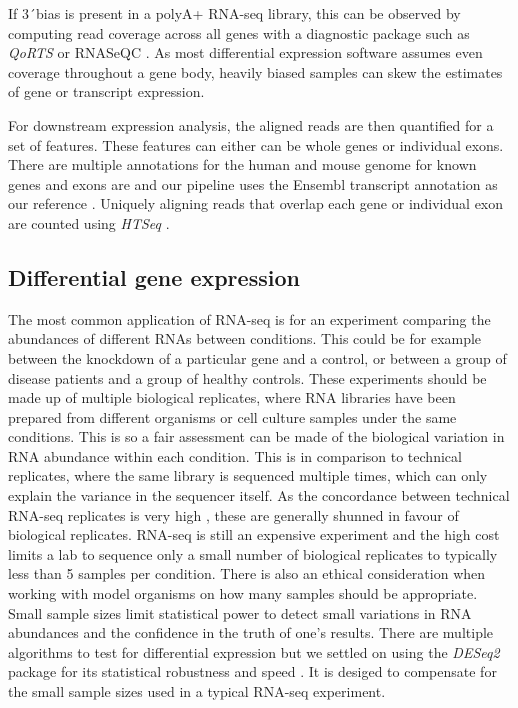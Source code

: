 If 3\'\ bias is present in a polyA+ RNA-seq library, this can be observed by computing read coverage across all genes with a diagnostic package such as \textit{QoRTS} or RNASeQC \citep{Hartley2015a, Deluca2012}. 
As most differential expression software assumes even coverage throughout a gene body, heavily biased samples can skew the estimates of gene or transcript expression.

For downstream expression analysis, the aligned reads are then quantified for a set of features. These features can either can be whole genes or individual exons. 
There are multiple annotations for the human and mouse genome for known genes and exons are and our pipeline uses the Ensembl transcript annotation as our reference \citep{Cunningham2015}. 
Uniquely aligning reads that overlap each gene or individual exon are counted using \textit{HTSeq} \citep{Anders2015-wz}.

\subsection{Differential gene expression}

The most common application of RNA-seq is for an experiment comparing the abundances of different RNAs between conditions.
This could be for example between the knockdown of a particular gene and a control, or between a group of disease patients and a group of healthy controls. 
These experiments should be made up of multiple biological replicates, where RNA libraries have been prepared from different organisms or cell culture samples under the same conditions. 
This is so a fair assessment can be made of the biological variation in RNA abundance within each condition. 
This is in comparison to technical replicates, where the same library is sequenced multiple times, which can only explain the variance  in the sequencer itself. 
As the concordance between technical RNA-seq replicates is very high \citep{Mortazavi2008}, these are generally shunned in favour of biological replicates. 
RNA-seq is still an expensive experiment and the high cost limits a lab to sequence only a small number of biological replicates to typically less than 5 samples per condition. 
There is also an ethical consideration when working with model organisms on how many samples should be appropriate.
Small sample sizes limit statistical power to detect small variations in RNA abundances and the confidence in the truth of one's results. 
There are multiple algorithms to test for differential expression but we settled on using the \textit{DESeq2} package for its statistical robustness and speed \citep{Love2014}. 
It is desiged to compensate for the small sample sizes used in a typical RNA-seq experiment.

